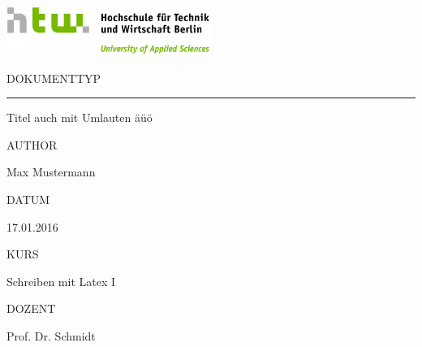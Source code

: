 \documentclass[12pt,a4paper]{report}
\begin{document}
  \begin{titlepage}

    \includegraphics[width=0.50\textwidth]{HTW_Logo_quer_rgb.jpg}

	  \vspace{4.0cm}

    \begin{changemargin}{0.5cm}{0.0cm} 		
			\color{htwgrau}
			\normalsize
			\textsf{\noindent\MakeUppercase{Dokumenttyp}} \vspace{-20pt}\\
			\noindent\rule{\textwidth}{0.5pt}\vspace{-4pt}		
			\color{black}
			\huge
			\textsf{Titel auch mit Umlauten äüö}
			\vspace{12pt}
			
			\color{htwgrau}
			\normalsize
			\textsf{\MakeUppercase{Author}}
			
			\color{black}
			\large
			\textsf{Max Mustermann}
			
			\color{htwgrau}
			\normalsize
			\textsf{\MakeUppercase{Datum}}
			
			\color{black}
			\large
			\textsf{17.01.2016}

			\vfill

			\color{htwgrau}
			\normalsize
			\textsf{\MakeUppercase{Kurs}}
			
			\color{black}
			\large
			\textsf{Schreiben mit Latex I}
			
			\color{htwgrau}
			\normalsize
			\textsf{\MakeUppercase{Dozent}}
			
			\color{black}
			\large
			\textsf{Prof. Dr. Schmidt}
			\vspace{-60pt}
		\end{changemargin} 		
	\end{titlepage}
\end{document}
